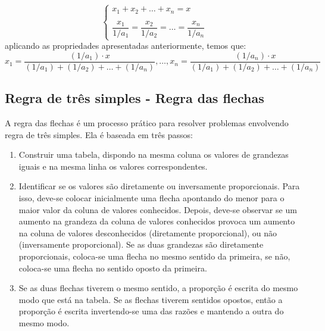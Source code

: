 \documentclass{article}
\begin{document}
\begin{equation*}
    \begin{cases}
        x_1+x_2+\ldots+x_n=x\\ \\
        \dfrac{x_1}{1/a_1}=\dfrac{x_2}{1/a_2}=\ldots=\dfrac{x_n}{1/a_n}
    \end{cases}
\end{equation*}
aplicando as propriedades apresentadas anteriormente, temos que:
\begin{equation*}
    x_1=\dfrac{(1/a_1)\cdot x}{(1/a_1)+(1/a_2)+\ldots+(1/a_n)},\ldots,x_n=\dfrac{(1/a_n)\cdot x}{(1/a_1)+(1/a_2)+\ldots+(1/a_n)}
\end{equation*}

\subsection{Regra de três simples - Regra das flechas}
A regra das flechas é um processo prático para resolver problemas envolvendo regra de três simples. Ela é baseada em três passos:
\begin{enumerate}
    \item Construir uma tabela, dispondo na mesma coluna os valores de grandezas iguais e na mesma linha os valores correspondentes.
    \item Identificar se os valores são diretamente ou inversamente proporcionais. Para isso, deve-se colocar inicialmente uma flecha apontando do menor para o maior valor da coluna de valores conhecidos. Depois, deve-se observar se um aumento na grandeza da coluna de valores conhecidos provoca um aumento na coluna de valores desconhecidos (diretamente proporcional), ou não (inversamente proporcional). Se as duas grandezas são diretamente proporcionais, coloca-se uma flecha no mesmo sentido da primeira, se não, coloca-se uma flecha no sentido oposto da primeira.
    \item Se as duas flechas tiverem o mesmo sentido, a proporção é escrita do mesmo modo que está na tabela. Se as flechas tiverem sentidos opostos, então a proporção é escrita invertendo-se uma das razões e mantendo a outra do mesmo modo.
\end{enumerate}
\end{document}
